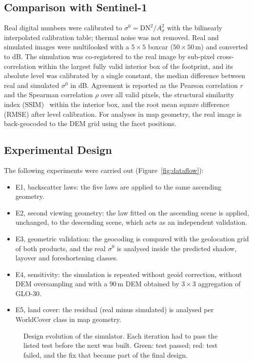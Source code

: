 \documentclass[10pt,a4paper]{article}
\newcommand{\sigz}{\sigma^0}
\begin{document}
\subsection{Comparison with Sentinel-1}
Real digital numbers were calibrated to $\sigz=\mathrm{DN}^2/A_\sigma^2$ with the bilinearly interpolated calibration table; thermal noise was not removed. Real and simulated images were multilooked with a $5\times5$ boxcar ($50\times50$\,m) and converted to dB. The simulation was co-registered to the real image by sub-pixel cross-correlation within the largest fully valid interior box of the footprint, and its absolute level was calibrated by a single constant, the median difference between real and simulated $\sigz$ in dB. Agreement is reported as the Pearson correlation $r$ and the Spearman correlation $\rho$ over all valid pixels, the structural similarity index (SSIM)~\cite{wang2004} within the interior box, and the root mean square difference (RMSE) after level calibration. For analyses in map geometry, the real image is back-geocoded to the DEM grid using the facet positions.

\subsection{Experimental Design}
The following experiments were carried out (Figure~\ref{fig:dataflow}):
\begin{itemize}
\item E1, backscatter laws: the five laws are applied to the same ascending geometry.
\item E2, second viewing geometry: the law fitted on the ascending scene is applied, unchanged, to the descending scene, which acts as an independent validation.
\item E3, geometric validation: the geocoding is compared with the geolocation grid of both products, and the real $\sigz$ is analysed inside the predicted shadow, layover and foreshortening classes.
\item E4, sensitivity: the simulation is repeated without geoid correction, without DEM oversampling and with a 90\,m DEM obtained by $3\times3$ aggregation of GLO-30.
\item E5, land cover: the residual (real minus simulated) is analysed per WorldCover class in map geometry.
\end{itemize}

\begin{figure}[htbp]
\centering

\caption{Data flow of the simulator. Blue: inputs; green: simulation; beige: real-image path; orange: products. The dashed loop fits the backscatter law to the real image and feeds it back into the simulation.}
\label{fig:dataflow}
\vspace{8mm}

\caption{Design evolution of the simulator. Each iteration had to pass the listed test before the next was built. Green: test passed; red: test failed, and the fix that became part of the final design.}
\label{fig:design}
\end{figure}
\end{document}
